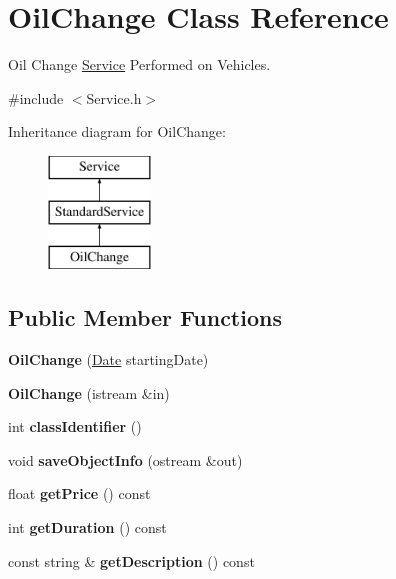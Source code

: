 \hypertarget{class_oil_change}{}\section{Oil\+Change Class Reference}
\label{class_oil_change}


Oil Change \hyperlink{class_service}{Service} Performed on Vehicles.  




{\ttfamily \#include $<$Service.\+h$>$}

Inheritance diagram for Oil\+Change\+:\begin{figure}[H]
\begin{center}
\leavevmode
\includegraphics[height=3.000000cm]{class_oil_change}
\end{center}
\end{figure}
\subsection*{Public Member Functions}
\begin{DoxyCompactItemize}
\item 
\hypertarget{class_oil_change_a1383f2d2827ef534c8c37c967283941e}{}{\bfseries Oil\+Change} (\hyperlink{struct_date}{Date} starting\+Date)\label{class_oil_change_a1383f2d2827ef534c8c37c967283941e}

\item 
\hypertarget{class_oil_change_a12a02bc018b33902272a06b31b62c683}{}{\bfseries Oil\+Change} (istream \&in)\label{class_oil_change_a12a02bc018b33902272a06b31b62c683}

\item 
\hypertarget{class_oil_change_a1f6b07d29276ce9fd0378b99345a4757}{}int {\bfseries class\+Identifier} ()\label{class_oil_change_a1f6b07d29276ce9fd0378b99345a4757}

\item 
\hypertarget{class_oil_change_a860cd72ae2a2bcad46d13ca7aadc8218}{}void {\bfseries save\+Object\+Info} (ostream \&out)\label{class_oil_change_a860cd72ae2a2bcad46d13ca7aadc8218}

\item 
\hypertarget{class_oil_change_a57566c0c32f7891ab35639fe8d0167db}{}float {\bfseries get\+Price} () const \label{class_oil_change_a57566c0c32f7891ab35639fe8d0167db}

\item 
\hypertarget{class_oil_change_a77b7cde26a4b6e21d4edec722cd1301c}{}int {\bfseries get\+Duration} () const \label{class_oil_change_a77b7cde26a4b6e21d4edec722cd1301c}

\item 
\hypertarget{class_oil_change_a9f5619aa6259abe36edee2ff4809ae10}{}const string \& {\bfseries get\+Description} () const \label{class_oil_change_a9f5619aa6259abe36edee2ff4809ae10}

\end{DoxyCompactItemize}

